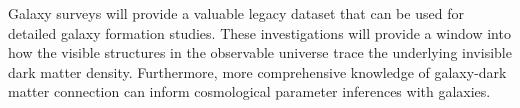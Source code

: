 Galaxy surveys will provide a valuable legacy dataset that can be used for detailed galaxy formation studies. 
These investigations will provide a window into how the visible structures in the observable universe 
trace the underlying invisible dark matter density. Furthermore, more comprehensive knowledge of galaxy-dark matter connection 
can inform cosmological parameter inferences with galaxies. 



 



